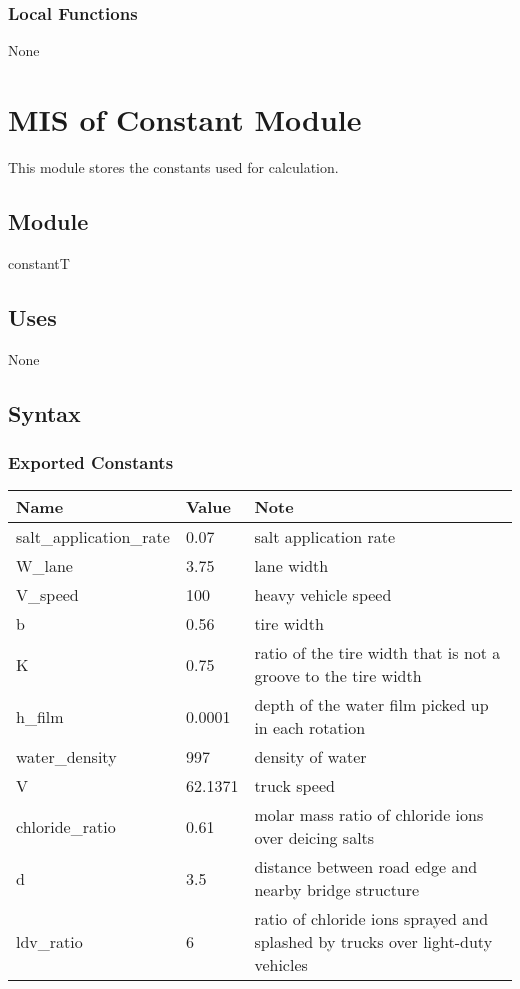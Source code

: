 \documentclass[12pt, titlepage]{article}
\begin{document}
\subsubsection{Local Functions}
None
\newpage


\section{MIS of Constant Module} \label{constantModule}
This module stores the constants used for calculation. 

\subsection{Module}
constantT

\subsection{Uses}

None


\subsection{Syntax}

\subsubsection{Exported Constants}

\begin{center}
\begin{tabular}{p{4cm} p{1.5cm} p{11cm}}
\hline
\textbf{Name} & \textbf{Value} & \textbf{Note} \\
\hline
salt\_application\_rate & 0.07 & salt application rate\\
W\_lane & 3.75 & lane width\\
V\_speed & 100 & heavy vehicle speed\\
b & 0.56 & tire width\\
K & 0.75 & ratio of the tire width that is not a groove to the tire width\\
h\_film & 0.0001 & depth of the water film picked up in each rotation\\
water\_density & 997 & density of water\\
V & 62.1371 & truck speed\\
chloride\_ratio & 0.61 & molar mass ratio of chloride ions over deicing salts\\
d & 3.5 & distance between road edge and nearby bridge structure\\
ldv\_ratio & 6 & ratio of chloride ions sprayed and splashed by trucks over light-duty vehicles\\
\hline
\end{tabular}
\end{center}
\end{document}
